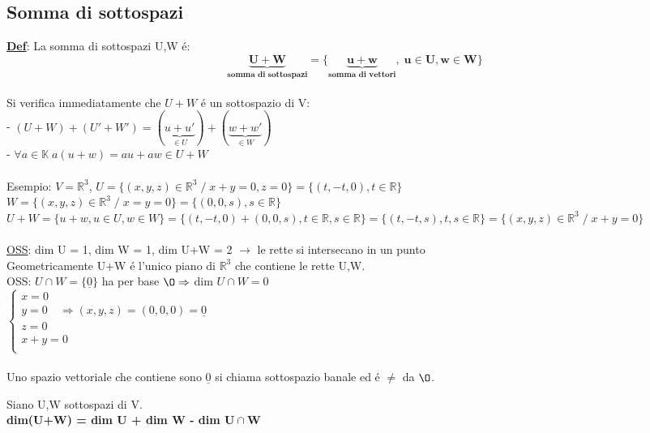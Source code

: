 \documentclass[12pt]{article}
\begin{document}
\subsection{Somma di sottospazi}
\textbf{\underline{Def}}: La somma di sottospazi U,W é:\\
$$\boldsymbol{\underbrace{U+W}_{\text{somma di sottospazi}} = \{\underbrace{u+w}_{\text{somma di vettori}},\; u\in U,w\in W\}}$$\\
Si verifica immediatamente che $U+W$ é un sottospazio di V:\\
- $(U+W)+(U'+W')=(\underbrace{u+u'}_{\in U}) + (\underbrace{w+w'}_{\in W})$\\
- $\forall a \in \mathbb{K} \; a(u+w) = au+aw \in U+W$\\\\
Esempio: $V = \mathbb{R}^3$, $U=\{(x,y,z) \in \mathbb{R}^3 \;/\; x+y=0, z=0\}=\{(t,-t,0),t\in \mathbb{R}\}$\\
$W=\{(x,y,z) \in \mathbb{R}^3 \;/\; x=y=0\}=\{(0,0,s),s\in \mathbb{R}\}$\\
$U+W = \{u+w,u\in U, w\in W\} = \{(t,-t,0) + (0,0,s), t\in \mathbb{R}, s\in \mathbb{R}\} =\{(t,-t,s), t,s\in \mathbb{R}\}=\{(x,y,z) \in \mathbb{R}^3 \;/\; x+y=0\} $\\\\
\underline{OSS}: dim U = 1, dim W = 1, dim U+W = 2 $\longrightarrow$ le rette si intersecano in un punto\\
Geometricamente U+W é l'unico piano di $\mathbb{R}^3$ che contiene le rette U,W.\\
OSS: $U\cap W = \{\underline{0}\}$ ha per base $\O \Rightarrow$ dim $U\cap W=0$\\
$\begin{cases}
    x=0\\
    y=0\quad \Longrightarrow(x,y,z) = (0,0,0) = \underline{0}\\
    z=0\\
    x+y=0\\
\end{cases}
$\\\\
Uno spazio vettoriale che contiene sono $\underline{0}$ si chiama sottospazio banale ed é $\neq$ da $\O$.
\begin{theorem}
    
Siano U,W sottospazi di V.\\
\textbf{dim(U+W) = dim U + dim W - dim $\boldsymbol{U\cap W}$}
\label{formula di Grassman}
\end{theorem}
\end{document}
